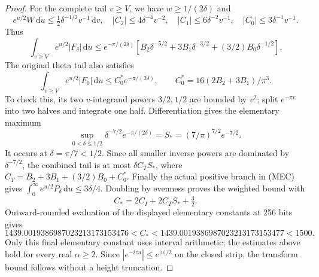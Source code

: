 \documentclass[11pt]{article}
\theoremstyle{remark}\newtheorem{remark}[theorem]{Remark}
\newcommand{\dd}{\,\mathrm d}
\begin{document}
\begin{proof}
For the complete tail $v\ge V$, we have $w\ge1/(2\delta)$ and
\[
 e^{u/2}W\dd u\le\tfrac12\delta^{-1/2}v^{-1}\dd v,
 \quad |C_2|\le4\delta^{-4}v^{-2},\quad
 |C_1|\le6\delta^{-2}v^{-1},\quad |C_0|\le3\delta^{-1}v^{-1}.
\]
Thus
\[
 \int_{v\ge V}e^{u/2}|F_\delta|\dd u
 \le e^{-\pi/(2\delta)}
       [B_2\delta^{-5/2}+3B_1\delta^{-3/2}+(3/2)B_0\delta^{-1/2}].
\]
The original theta tail also satisfies
\[
 \int_{v\ge V}e^{u/2}|F_0|\dd u
 \le C_0^*e^{-\pi/(2\delta)},\qquad
 C_0^*=16(2B_2+3B_1)/\pi^3.
\]
To check this, its two $v$-integrand powers $3/2,1/2$ are bounded
by $v^2$; split $e^{-\pi v}$ into two halves and integrate one half.
Differentiation gives the elementary maximum
\[
 \sup_{0<\delta\le1/2}\delta^{-7/2}e^{-\pi/(2\delta)}
     =S_*=(7/\pi)^{7/2}e^{-7/2}.
\]
It occurs at $\delta=\pi/7<1/2$. Since all smaller inverse powers
are dominated by $\delta^{-7/2}$, the combined tail is at most
$\delta C_TS_*$, where $C_T=B_2+3B_1+(3/2)B_0+C_0^*$.
Finally the actual positive branch in (MEC) gives
$\int_0^\infty e^{u/2}P_\delta\dd u\le3\delta/4$.
Doubling by evenness proves the weighted bound with
\[
 C_*=2C_I+2C_TS_*+\tfrac32.
\]
Outward-rounded evaluation of the displayed elementary constants
at 256 bits gives
\[
 1439.0019386987023213173153476<C_*<
 1439.0019386987023213173153477<1500.
\]
Only this final elementary constant uses interval arithmetic; the
estimates above hold for every real $\alpha\ge2$.
Since $|e^{-izu}|\le e^{|u|/2}$ on the closed strip, the transform
bound follows without a height truncation.
\end{proof}
\end{document}
